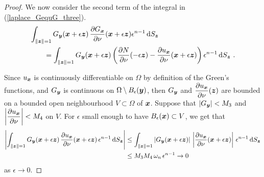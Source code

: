 \begin{proof}
We now consider the second term of the integral in
(\ref{laplace_GequG_three}).
\begin{align*}
& \int_{\|{\bm{z}}\|=1}
G_{{\bm{y}}}({\bm{x}}+\epsilon {\bm{z}})
\,\frac{\partial{G_{{\bm{x}}}}}{\partial \nu}({\bm{x}}+\epsilon {\bm{z}})
\epsilon^{n-1}\,\mathrm{d}{S}_{{\bm{z}}} \\
& \qquad = \int_{\|{\bm{z}}\|=1}
G_{{\bm{y}}}({\bm{x}}+\epsilon {\bm{z}})
\left( \frac{\partial{N}}{\partial \nu}(-\epsilon {\bm{z}})
- \frac{\partial{u_{{\bm{x}}}}}{\partial \nu}({\bm{x}}+\epsilon {\bm{z}}) \right)
\epsilon^{n-1}\,\mathrm{d}{S}_{{\bm{z}}} \ .
\end{align*}

Since $u_{{\bm{x}}}$ is continuously differentiable on $\Omega$ by
definition of the Green's functions, and $G_{{\bm{y}}}$ is continuous
on $\Omega \setminus B_{\epsilon}({\bm{y}})$, then $G_{{\bm{y}}}$ and
$\displaystyle \frac{\partial{u_{{\bm{x}}}}}{\partial \nu}({\bm{z}})$ are bounded on a
bounded open neighbourhood $V \subset \Omega$ of ${\bm{x}}$.  Suppose that
$|G_{{\bm{y}}}| < M_3$ and
$\displaystyle \left| \frac{\partial{u_{{\bm{x}}}}}{\partial \nu}\right| < M_4$
on $V$.  For $\epsilon$ small enough to have
$B_\epsilon({\bm{x}}) \subset V$, we get that
\begin{align*}
\left| \int_{\|{\bm{z}}\|=1}
G_{{\bm{y}}}({\bm{x}}+\epsilon {\bm{z}})
\,\frac{\partial{u_{{\bm{x}}}}}{\partial \nu}({\bm{x}}+\epsilon {\bm{z}})
\, \epsilon^{n-1} \,\mathrm{d}{S}_{{\bm{z}}} \right|
& \leq \int_{\|{\bm{z}}\|=1}
\left| G_{{\bm{y}}}({\bm{x}} + \epsilon {\bm{z}}) \right|
\, \left|\frac{\partial{u_{{\bm{x}}}}}{\partial \nu}({\bm{x}}+\epsilon {\bm{z}})
\right| \, \epsilon^{n-1} \,\mathrm{d}{S}_{{\bm{z}}} \\
& \leq M_3 M_4\, \omega_n\, \epsilon^{n-1}  \to 0
\end{align*}
as $\epsilon \to 0$.


\end{proof}
